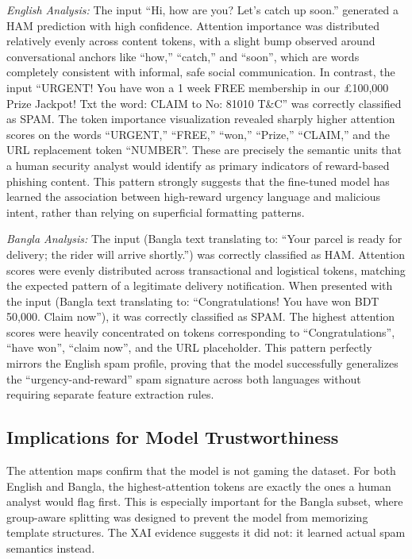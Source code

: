 \documentclass[journal]{IEEEtran}
\begin{document}
\textit{English Analysis:} The input ``Hi, how are you? Let's catch up soon.'' generated a HAM prediction with high confidence. Attention importance was distributed relatively evenly across content tokens, with a slight bump observed around conversational anchors like ``how,'' ``catch,'' and ``soon'', which are words completely consistent with informal, safe social communication. In contrast, the input ``URGENT! You have won a 1 week FREE membership in our \pounds 100,000 Prize Jackpot! Txt the word: CLAIM to No: 81010 T\&C'' was correctly classified as SPAM. The token importance visualization revealed sharply higher attention scores on the words ``URGENT,'' ``FREE,'' ``won,'' ``Prize,'' ``CLAIM,'' and the URL replacement token ``NUMBER''. These are precisely the semantic units that a human security analyst would identify as primary indicators of reward-based phishing content. This pattern strongly suggests that the fine-tuned model has learned the association between high-reward urgency language and malicious intent, rather than relying on superficial formatting patterns.

\textit{Bangla Analysis:} The input (Bangla text translating to: ``Your parcel is ready for delivery; the rider will arrive shortly.'') was correctly classified as HAM. Attention scores were evenly distributed across transactional and logistical tokens, matching the expected pattern of a legitimate delivery notification. When presented with the input (Bangla text translating to: ``Congratulations! You have won BDT 50,000. Claim now''), it was correctly classified as SPAM. The highest attention scores were heavily concentrated on tokens corresponding to ``Congratulations'', ``have won'', ``claim now'', and the URL placeholder. This pattern perfectly mirrors the English spam profile, proving that the model successfully generalizes the ``urgency-and-reward'' spam signature across both languages without requiring separate feature extraction rules.

\subsection{Implications for Model Trustworthiness}

The attention maps confirm that the model is not gaming the dataset. For both English and Bangla, the highest-attention tokens are exactly the ones a human analyst would flag first. This is especially important for the Bangla subset, where group-aware splitting was designed to prevent the model from memorizing template structures. The XAI evidence suggests it did not: it learned actual spam semantics instead.
\end{document}
